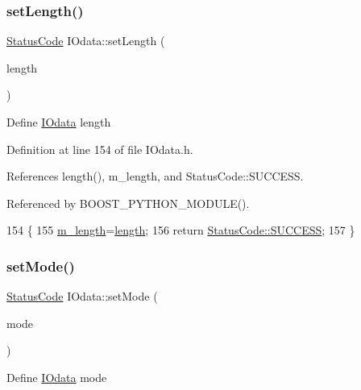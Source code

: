 \subsubsection{\texorpdfstring{set\+Length()}{setLength()}}
{\footnotesize\ttfamily \hyperlink{classStatusCode}{Status\+Code} I\+Odata\+::set\+Length (\begin{DoxyParamCaption}\item[{\hyperlink{classIOdata_a96fb57f5fcd87b708743abd3c86a5198}{U32}}]{length }\end{DoxyParamCaption})\hspace{0.3cm}{\ttfamily [inline]}}

Define \hyperlink{classIOdata}{I\+Odata} length 

Definition at line 154 of file I\+Odata.\+h.



References length(), m\+\_\+length, and Status\+Code\+::\+S\+U\+C\+C\+E\+SS.



Referenced by B\+O\+O\+S\+T\+\_\+\+P\+Y\+T\+H\+O\+N\+\_\+\+M\+O\+D\+U\+L\+E().


\begin{DoxyCode}
154                                   \{
155     \hyperlink{classIOdata_afabe57441da019eb614d277799106aac}{m\_length}=\hyperlink{classIOdata_abb40e71ce0290832a24857b4a1e7b1a3}{length};
156     \textcolor{keywordflow}{return} \hyperlink{classStatusCode_a6f565cbeadc76d14c72f047e5e85eb4badd0da38d3ba0d922efd1f4619bc37ad8}{StatusCode::SUCCESS};
157   \}
\end{DoxyCode}
\mbox{\label{classIOdata_ad81e9fd3f2cd9dcaffd9eabddf8f867e}} 
\subsubsection{\texorpdfstring{set\+Mode()}{setMode()}}
{\footnotesize\ttfamily \hyperlink{classStatusCode}{Status\+Code} I\+Odata\+::set\+Mode (\begin{DoxyParamCaption}\item[{\hyperlink{classIOdata_a044e9a4a0c6d25a43ebfe29c4fa4f1e5}{I\+Odata\+::\+Mode}}]{mode }\end{DoxyParamCaption})\hspace{0.3cm}{\ttfamily [inline]}}

Define \hyperlink{classIOdata}{I\+Odata} mode 

